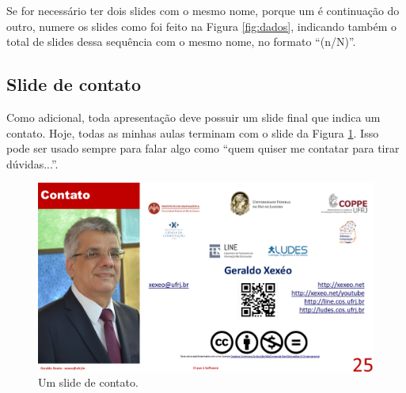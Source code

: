 Se for necessário ter dois slides com o mesmo nome, porque um é continuação do outro, numere os slides como foi feito na Figura \ref{fig:dados}, indicando também o total de slides dessa sequência com o mesmo nome, no formato ``(n/N)''.



\subsection{Slide de contato}

Como adicional, toda apresentação deve possuir um slide final que indica um contato. Hoje, todas as minhas aulas terminam com o slide da Figura \ref{fig:fim}. Isso pode ser usado sempre para falar algo como ``quem quiser me contatar para tirar dúvidas...''.

\begin{figure}[h]
    \centering
    \includegraphics[width=\tam\linewidth,frame]{imagens/fim.png}
    \caption{Um slide de contato.}
    \label{fig:fim}
\end{figure}



